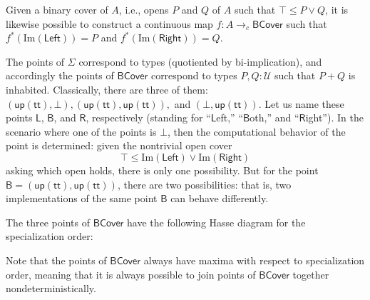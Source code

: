 \documentclass[conference]{IEEEtran}
\newcommand{\cto}{\to_c}
\newcommand{\Type}{\mathcal{U}}
\newcommand{\Img}[1]{\text{Im}\left({#1}\right)}
\newcommand{\strue}{\mathsf{up}(\mathsf{tt})}
\newcommand{\sfalse}{\bot}
\newcommand{\BCover}{\mathsf{BCover}}
\newcommand{\iimg}[1]{#1^*}
\begin{document}
Given a binary cover of $A$, i.e., opens $P$ and $Q$ of $A$ such that $\top \le P \vee Q$, it is likewise possible to construct a continuous map $f: A \cto \BCover$ such that $\iimg{f}(\Img{\mathsf{Left}}) = P$ and $\iimg{f}(\Img{\mathsf{Right}}) = Q$.

The points of $\Sigma$ correspond to types (quotiented by bi-implication), and accordingly the points of $\BCover$ correspond to types $P, Q : \Type$ such that $P + Q$ is inhabited. Classically, there are three of them: $(\strue, \sfalse), (\strue, \strue),$ and $(\sfalse, \strue)$. Let us name these points $\mathsf{L}$, $\mathsf{B}$, and $\mathsf{R}$, respectively (standing for ``$\mathsf{L}$eft,'' ``$\mathsf{B}$oth,'' and ``$\mathsf{R}$ight''). In the scenario where one of the points is $\sfalse$, then the computational behavior of the point is determined: given the nontrivial open cover 
\[
\top \le \Img{\mathsf{Left}} \vee \Img{\mathsf{Right}}
\]
asking which open holds, there is only one possibility. But for the point $\mathsf{B} = (\strue, \strue)$, there are two possibilities: that is, two implementations of the same point $\mathsf{B}$ can behave differently.

The three points of $\BCover$ have the following Hasse diagram for the specialization order:
\begin{center}
\end{center}
Note that the points of $\BCover$ always have maxima with respect to specialization order, meaning that it is always possible to join points of $\BCover$ together nondeterministically.
\end{document}
